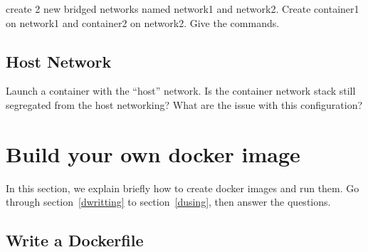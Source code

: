 \documentclass[a4paper,11pt]{exam}
\begin{document}
\begin{questions}
	\question create 2 new bridged networks named network1 and network2. Create container1 on network1 and container2 on network2. Give the commands.
	\question 
\end{questions}

	
\subsection{Host Network}
\begin{questions}

	\question Launch a container with the ``host'' network. Is the container network stack still segregated from the host networking?  What are the issue with this configuration?
%
%
\end{questions}


\section{Build your own docker image}
In this section, we explain briefly how to create docker images and run them. Go through section~\ref{dwritting} to section~\ref{dusing}, then answer the questions.

\subsection{Write a Dockerfile \label{dwritting}}
\end{document}

